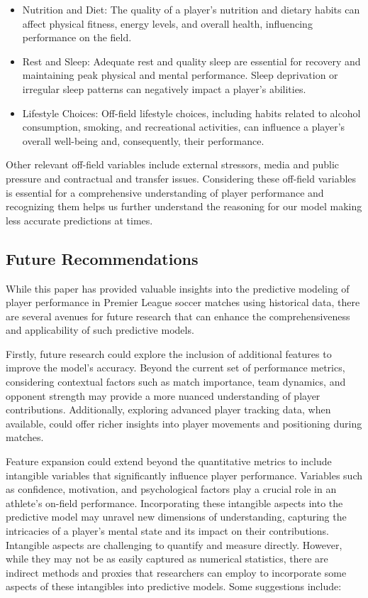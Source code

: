 \documentclass[12pt]{article}
\begin{document}
\begin{itemize}
  \item Nutrition and Diet: The quality of a player's nutrition and dietary habits can
  affect physical fitness, energy levels, and overall health, influencing
  performance on the field.
  \item Rest and Sleep: Adequate rest and quality sleep are essential for recovery and
  maintaining peak physical and mental performance. Sleep deprivation or irregular
  sleep patterns can negatively impact a player's abilities.
  \item Lifestyle Choices: Off-field lifestyle choices, including habits related to
  alcohol consumption, smoking, and recreational activities, can influence a
  player's overall well-being and, consequently, their performance.
\end{itemize}

Other relevant off-field variables include external stressors, media and public
pressure and contractual and transfer issues. Considering these off-field
variables is essential for a comprehensive understanding of player performance
and recognizing them helps us further understand the reasoning for our model
making less accurate predictions at times.

\subsection{Future Recommendations}

While this paper has provided valuable insights into the predictive modeling of
player performance in Premier League soccer matches using historical data, there
are several avenues for future research that can enhance the
comprehensiveness and applicability of such predictive models.

Firstly, future research could explore the inclusion of additional features to
improve the model's accuracy. Beyond the current set of performance metrics,
considering contextual factors such as match importance, team dynamics, and
opponent strength may provide a more nuanced understanding of player contributions.
Additionally, exploring advanced player tracking data, when available, could
offer richer insights into player movements and positioning during matches.

Feature expansion could extend beyond the quantitative metrics to include
intangible variables that significantly influence player performance. Variables
such as confidence, motivation, and psychological factors play a crucial role in
an athlete's on-field performance. Incorporating these intangible aspects into
the predictive model may unravel new dimensions of understanding, capturing the
intricacies of a player's mental state and its impact on their contributions.
Intangible aspects are challenging to quantify and measure directly. However,
while they may not be as easily captured as numerical statistics, there are
indirect methods and proxies that researchers can employ to incorporate some
aspects of these intangibles into predictive models.
Some suggestions include:
\end{document}
